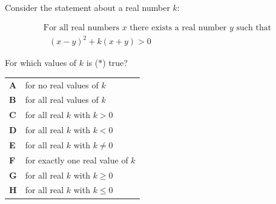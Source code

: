 \documentclass[11pt,a4paper]{article}
\begin{document}
\clearpage
\thispagestyle{djspaper}
\vspace*{8pt}
\begin{enumerate}[label=\textbf{\arabic*.},leftmargin=*,itemsep=0pt,start=20]
\questionitem[Logic]
Consider the statement about a real number $k$:

\[ \begin{array}{c}
\text{For all real numbers $x$ there exists a real number $y$ such that} \\ \text{ $(x-y)^2+k(x+y)>0$}
\end{array} \tag{$\ast$} \]

For which values of $k$ is ($\ast$) true?

\par\vspace*{12pt}
\begin{tabularx}{\linewidth}{@{}>{\bfseries}l Y@{}}
A &
for no real values of $k$
\\[0.8em]
B &
for all real values of $k$
\\[0.8em]
C &
for all real $k$ with $k>0$ 
\\[0.8em]
D &
for all real $k$ with $k<0$ 
\\[0.8em]
E &
for all real $k$ with $k\ne 0$ 
\\[0.8em]
F &
for exactly one real value of $k$
\\[0.8em]
G &
for all real $k$ with $k\geq0$ 
\\[0.8em]
H &
for all real $k$ with $k\leq 0$ 
\\
\end{tabularx}
\end{enumerate}
\end{document}
